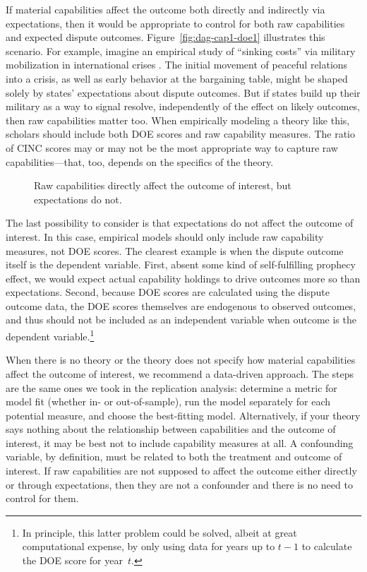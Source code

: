 If material capabilities affect the outcome both directly and indirectly via expectations, then it would be appropriate to control for both raw capabilities and expected dispute outcomes.
Figure~\ref{fig:dag-cap1-doe1} illustrates this scenario.
For example, imagine an empirical study of ``sinking costs'' via military mobilization in international crises \citep{fearon_signaling_1997}.
The initial movement of peaceful relations into a crisis, as well as early behavior at the bargaining table, might be shaped solely by states' expectations about dispute outcomes.
But if states build up their military as a way to signal resolve, independently of the effect on likely outcomes, then raw capabilities matter too.
When empirically modeling a theory like this, scholars should include both DOE scores and raw capability measures.
The ratio of CINC scores may or may not be the most appropriate way to capture raw capabilities---that, too, depends on the specifics of the theory.

\begin{figure}[htp]
  \centering
  
  \caption{
    Raw capabilities directly affect the outcome of interest, but expectations do not.
  }
  \label{fig:dag-cap1-doe0}
\end{figure}

The last possibility to consider is that expectations do not affect the outcome of interest.
In this case, empirical models should only include raw capability measures, not DOE scores.
The clearest example is when the dispute outcome itself is the dependent variable.
First, absent some kind of self-fulfilling prophecy effect, we would expect actual capability holdings to drive outcomes more so than expectations.
Second, because DOE scores are calculated using the dispute outcome data, the DOE scores themselves are endogenous to observed outcomes, and thus should not be included as an independent variable when outcome is the dependent variable.\footnote{%
  In principle, this latter problem could be solved, albeit at great computational expense, by only using data for years up to $t-1$ to calculate the DOE score for year~$t$.
}

When there is no theory or the theory does not specify how material capabilities affect the outcome of interest, we recommend a data-driven approach.
The steps are the same ones we took in the replication analysis: determine a metric for model fit (whether in- or out-of-sample), run the model separately for each potential measure, and choose the best-fitting model.
Alternatively, if your theory says nothing about the relationship between capabilities and the outcome of interest, it may be best not to include capability measures at all.
A confounding variable, by definition, must be related to both the treatment and outcome of interest.
If raw capabilities are not supposed to affect the outcome either directly or through expectations, then they are not a confounder and there is no need to control for them.

